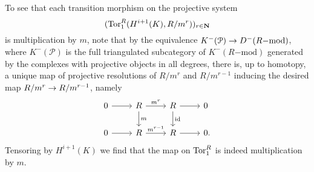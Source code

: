 \documentclass[deligne.tex]{subfiles}
\begin{document}
\begin{remark}
To see that each transition morphism on the projective
system
\begin{equation*}
	(\operatorname{Tor}_1^R(H^{i+1}(K),R/m^r))_{r\in\mathbf{N}}
\end{equation*}
is multiplication by $m$, note
that by the equivalence $K^-(\mathcal P)\rightarrow D^-(R\mathrm{-mod})$, where
$K^-(\mathcal P)$ is the full triangulated subcategory of
$K^-(R\mathrm{-mod})$ generated by the complexes with projective objects in 
all degrees, there is, up to homotopy, a unique map of projective
resolutions of $R/m^r$ and $R/m^{r-1}$ inducing the desired map
$R/m^r\rightarrow R/m^{r-1}$, namely
\begin{equation*}
\begin{tikzcd}
	0\arrow[r]&R\arrow[r,"m^r"]\arrow[d,"m"]&R\arrow[r]\arrow[d,"\id"]&0\;\\
	0\arrow[r]&R\arrow[r,"m^{r-1}"]&R\arrow[r]&0.
\end{tikzcd}
\end{equation*}
Tensoring by $H^{i+1}(K)$ we find that the map on $\operatorname{Tor}_1^R$ is indeed
multiplication by $m$.
\end{remark}
\end{document}
